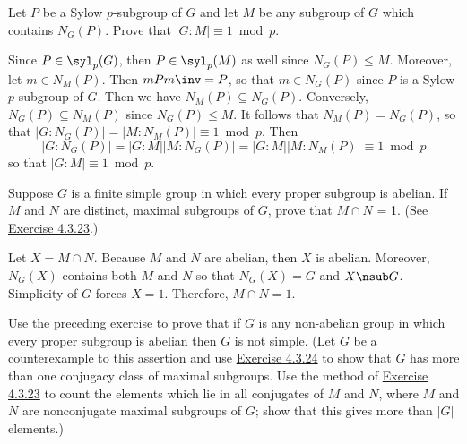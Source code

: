 \newpage

\begin{exercise}\label{ex4.5.51}
	Let $P$ be a Sylow $p$-subgroup of $G$ and let $M$ be any subgroup of $G$ which contains $N_G(P)$. Prove that $|G : M| \equiv 1 \bmod p$.
\end{exercise}

\begin{sol}
	Since $P \in \syl_p(G)$, then $P \in \syl_p(M)$ as well since $N_G(P) \leq M$. Moreover, let $m \in N_M(P)$. Then $mPm\inv = P$, so that $m \in N_G(P)$ since $P$ is a Sylow $p$-subgroup of $G$. Then we have $N_M(P) \subseteq N_G(P)$. Conversely, $N_G(P) \subseteq N_M(P)$ since $N_G(P) \leq M$. It follows that $N_M(P) = N_G(P)$, so that $|G : N_G(P)| = |M : N_M(P)| \equiv 1 \bmod p$. Then
	\[|G : N_G(P)| = |G : M||M : N_G(P)| = |G : M||M : N_M(P)| \equiv 1 \bmod p\]
	so that $|G : M| \equiv 1 \bmod p$.
\end{sol}

\begin{exercise}\label{ex4.5.52}
	Suppose $G$ is a finite simple group in which every proper subgroup is abelian. If $M$ and $N$ are distinct, maximal subgroups of $G$, prove that $M \cap N$ = 1. (See \hyperref[ex4.3.23]{Exercise 4.3.23}.)
\end{exercise}

\begin{sol}
	Let $X = M \cap N$. Because $M$ and $N$ are abelian, then $X$ is abelian. Moreover, $N_G(X)$ contains both $M$ and $N$ so that $N_G(X) = G$ and $X \nsub G$. Simplicity of $G$ forces $X = 1$. Therefore, $M \cap N = 1$.
\end{sol}

\begin{exercise}\label{ex4.5.53}
	Use the preceding exercise to prove that if $G$ is any non-abelian group in which every proper subgroup is abelian then $G$ is not simple. (Let $G$ be a counterexample to this assertion and use \hyperref[ex4.3.24]{Exercise 4.3.24} to show that $G$ has more than one conjugacy class of maximal subgroups. Use the method of \hyperref[ex4.3.23]{Exercise 4.3.23} to count the elements which lie in all conjugates of $M$ and $N$, where $M$ and $N$ are nonconjugate maximal subgroups of $G$; show that this gives more than $|G|$ elements.)
\end{exercise}

